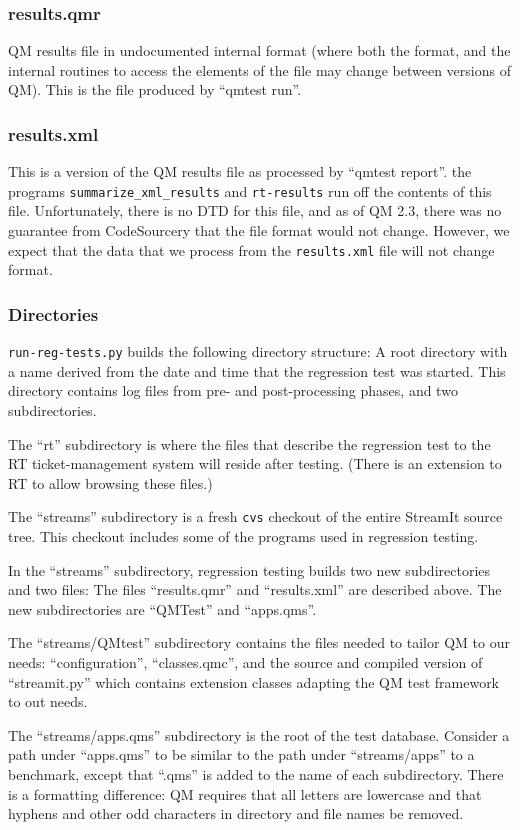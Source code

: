 \documentclass[11pt]{article}
\begin{document}
\subsubsection{results.qmr}
QM results file in undocumented internal format (where both the
format, and the internal routines to access the elements of the file
may change between versions of QM).  This is the file produced by
``qmtest run''.

\subsubsection{results.xml}
This is a version of the QM results file as processed by ``qmtest report''.
the programs {\tt summarize\_xml\_results} and {\tt rt-results} run off
the contents of this file.
Unfortunately, there is no DTD for this file, and as of QM 2.3, there
was no guarantee from CodeSourcery that the file format would not
change.
However, we expect that the data that we process from the {\tt results.xml}
file will not change format.

\subsubsection{Directories}
{\tt run-reg-tests.py} builds the following directory structure:
A root directory with a name derived from the date and time that the
regression test was started.
This directory contains log files from pre- and post-processing
phases, and two subdirectories.

The ``rt'' subdirectory is where the files that describe the
regression test to the RT ticket-management system will reside after
testing. (There is an extension to RT to allow browsing these files.)

The ``streams'' subdirectory is a fresh {\tt cvs} checkout of the
entire StreamIt source tree.  This checkout includes some of the
programs used in regression testing.

In the ``streams'' subdirectory, regression testing builds two new
subdirectories and two files:  The files ``results.qmr'' and
``results.xml'' are described above.
The new subdirectories are ``QMTest'' and ``apps.qms''.

The ``streams/QMtest'' subdirectory contains the files needed to
tailor QM to our needs:  ``configuration'', ``classes.qmc'', and the
source and compiled version of ``streamit.py'' which contains extension
classes adapting the QM test framework to out needs.

The ``streams/apps.qms'' subdirectory is the root of the test
database.  Consider a path under ``apps.qms'' to be similar to the
path under ``streams/apps'' to a benchmark, except that ``.qms'' is
added to the name of each subdirectory.  There is a formatting
difference: QM requires that all letters are lowercase and that
hyphens and other odd characters in directory and file names be
removed.
\end{document}
